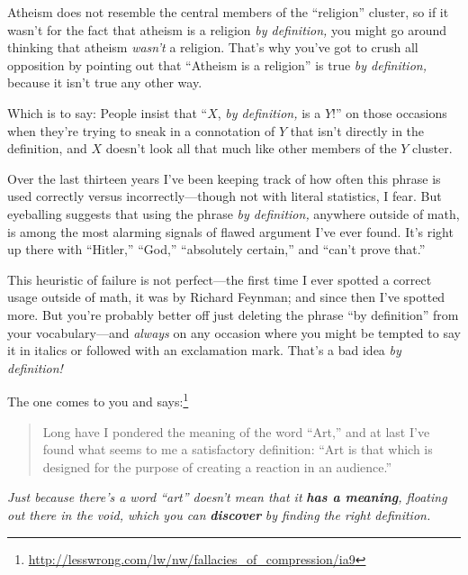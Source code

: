 {{{
 Atheism does not resemble the central members of the
``religion'' cluster, so if it
wasn't for the fact that atheism is a religion
\textit{by definition,} you might go around thinking that atheism
\textit{wasn't} a religion. That's why
you've got to crush all opposition by pointing out that
``Atheism is a religion'' is true
\textit{by definition,} because it isn't true any other
way.}

{
 Which is to say: People insist that ``$X$,
\textit{by definition,} is a $Y$!'' on those occasions
when they're trying to sneak in a connotation of $Y$ that
isn't directly in the definition, and $X$
doesn't look all that much like other members of the $Y$
cluster.}

{
 Over the last thirteen years I've been keeping
track of how often this phrase is used correctly versus
incorrectly---though not with literal statistics, I fear. But
eyeballing suggests that using the phrase \textit{by definition,}
anywhere outside of math, is among the most alarming signals of flawed
argument I've ever found. It's right up
there with ``Hitler,''
``God,''
``absolutely certain,'' and
``can't prove
that.''}

{
 This heuristic of failure is not perfect---the first time I ever
spotted a correct usage outside of math, it was by Richard Feynman; and
since then I've spotted more. But
you're probably better off just deleting the phrase
``by definition'' from your
vocabulary---and \textit{always} on any occasion where you might be
tempted to say it in italics or followed with an exclamation mark.
That's a bad idea \textit{by definition!}}

\myendsectiontext


{
 The one comes to you and says:\footnote{\url{http://lesswrong.com/lw/nw/fallacies_of_compression/ia9}}}

\begin{quote}
{
 Long have I pondered the meaning of the word
``Art,'' and at last
I've found what seems to me a satisfactory definition:
``Art is that which is designed for the purpose of
creating a reaction in an audience.''}
\end{quote}

{
 \textit{Just because there's a word
``art'' doesn't mean
that it }\textbf{\textit{has a meaning}}\textit{, floating out there in
the void, which you can }\textbf{\textit{discover}}\textit{ by finding
the right definition.}}

}}
